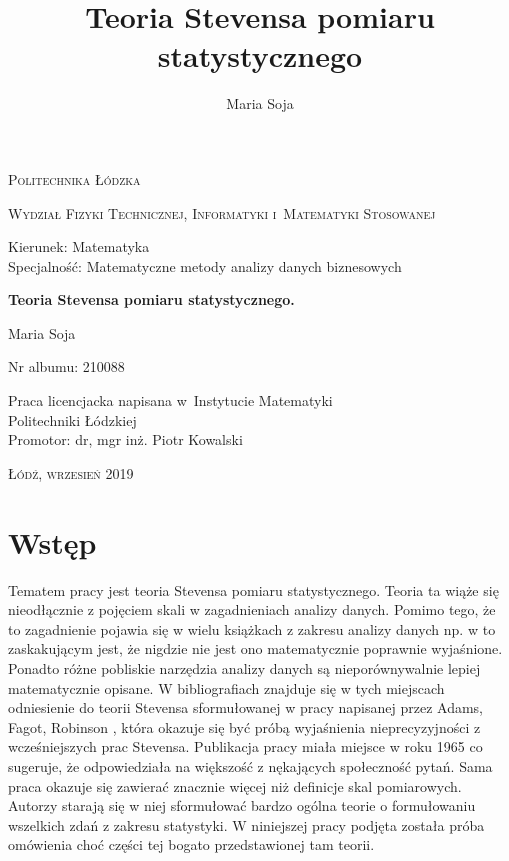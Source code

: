 \documentclass[12pt,a4paper]{report}
\author{Maria Soja}
\title{Teoria Stevensa pomiaru statystycznego}
\begin{document}
\begin{titlepage}
\begin{flushleft}
\end{flushleft}
\begin{center}
\textsc{{\huge Politechnika Łódzka}}
\end{center}
\bigskip
\bigskip
\begin{center}
\textsc{{\Large Wydział Fizyki Technicznej, Informatyki i~Matematyki Stosowanej}}
\end{center}
\bigskip
\bigskip
\begin{Large}
Kierunek: Matematyka 
\\Specjalność: Matematyczne metody analizy danych biznesowych

\end{Large}
\bigskip
\bigskip
\noindent\hrulefill
\begin{center}
{\textbf{{\Large Teoria Stevensa pomiaru statystycznego.}}}
\end{center}
\begin{flushright}
{\large 
Maria Soja

Nr albumu: 
210088
}
\end{flushright}
\noindent\hrulefill
\bigskip
\bigskip
\begin{center}
{\large Praca licencjacka
napisana w~Instytucie Matematyki 
\\Politechniki Łódzkiej 
\bigskip
\bigskip
\\Promotor: dr, mgr inż. Piotr Kowalski
 }
\end{center}
\bigskip
\bigskip
\bigskip
\bigskip
\begin{center}
{\textsc{\large Łódź, wrzesień 2019}}
\end{center}
\end{titlepage}


\tableofcontents

\chapter{Wstęp}

Tematem pracy jest teoria Stevensa pomiaru statystycznego. Teoria ta wiąże się nieodłącznie z pojęciem skali w zagadnieniach analizy danych. Pomimo tego, że to zagadnienie pojawia się w wielu książkach z zakresu analizy danych np. w {\citep{walesiak2009statystyczna}} to zaskakującym jest, że nigdzie nie jest ono matematycznie poprawnie wyjaśnione. Ponadto różne pobliskie narzędzia analizy danych są nieporównywalnie lepiej matematycznie opisane. W bibliografiach znajduje się w tych miejscach odniesienie do teorii Stevensa sformułowanej w pracy napisanej przez Adams, Fagot, Robinson {\citep{adams1965theory}}, która okazuje się być próbą wyjaśnienia nieprecyzyjności z wcześniejszych prac Stevensa. Publikacja pracy miała miejsce w roku 1965 co sugeruje, że odpowiedziała na większość z nękających społeczność pytań. Sama praca okazuje się zawierać znacznie więcej niż definicje skal pomiarowych. Autorzy starają się w niej sformułować bardzo ogólna teorie o formułowaniu wszelkich zdań z zakresu statystyki. W niniejszej pracy podjęta została próba omówienia choć części tej bogato przedstawionej tam teorii. 
 
\end{document}
